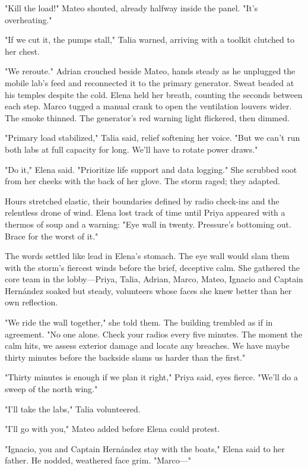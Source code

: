 "Kill the load!" Mateo shouted, already halfway inside the panel. "It's overheating."

"If we cut it, the pumps stall," Talia warned, arriving with a toolkit clutched to her chest.

"We reroute." Adrian crouched beside Mateo, hands steady as he unplugged the mobile lab's feed and reconnected it to the primary generator. Sweat beaded at his temples despite the cold. Elena held her breath, counting the seconds between each step. Marco tugged a manual crank to open the ventilation louvers wider. The smoke thinned. The generator's red warning light flickered, then dimmed.

"Primary load stabilized," Talia said, relief softening her voice. "But we can't run both labs at full capacity for long. We'll have to rotate power draws."

"Do it," Elena said. "Prioritize life support and data logging." She scrubbed soot from her cheeks with the back of her glove. The storm raged; they adapted.

Hours stretched elastic, their boundaries defined by radio check-ins and the relentless drone of wind. Elena lost track of time until Priya appeared with a thermos of soup and a warning: "Eye wall in twenty. Pressure's bottoming out. Brace for the worst of it."

The words settled like lead in Elena's stomach. The eye wall would slam them with the storm's fiercest winds before the brief, deceptive calm. She gathered the core team in the lobby—Priya, Talia, Adrian, Marco, Mateo, Ignacio and Captain Hernández soaked but steady, volunteers whose faces she knew better than her own reflection.

"We ride the wall together," she told them. The building trembled as if in agreement. "No one alone. Check your radios every five minutes. The moment the calm hits, we assess exterior damage and locate any breaches. We have maybe thirty minutes before the backside slams us harder than the first."

"Thirty minutes is enough if we plan it right," Priya said, eyes fierce. "We'll do a sweep of the north wing."

"I'll take the labs," Talia volunteered.

"I'll go with you," Mateo added before Elena could protest.

"Ignacio, you and Captain Hernández stay with the boats," Elena said to her father. He nodded, weathered face grim. "Marco—"

